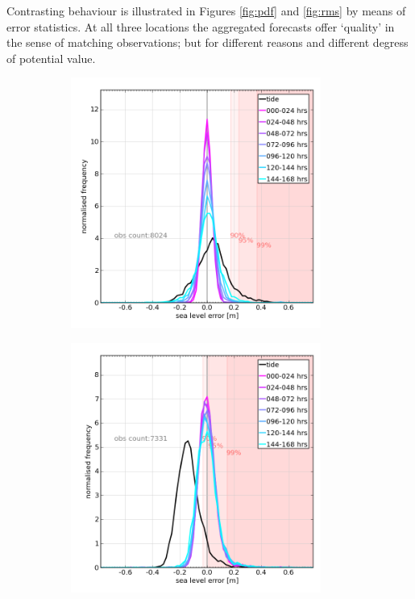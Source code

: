 Contrasting behaviour is illustrated in Figures \ref{fig:pdf} and \ref{fig:rms} by means of error statistics.
At all three locations the aggregated forecasts offer `quality' in the sense of matching observations; but for different reasons and different degress of potential value. 

\begin{figure}[H]
    \centering
    \begin{subfigure}{0.30\textwidth}
    \includegraphics[width=0.9\textwidth]{figures/plots/0013_verify_pdf.png}
    \caption{}
    \end{subfigure}
    \begin{subfigure}{0.30\textwidth}
    \includegraphics[width=0.9\textwidth]{figures/plots/0043_verify_pdf.png}

\end{subfigure}
\end{figure}
